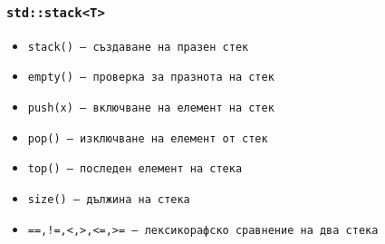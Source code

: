\documentclass{beamer}
\begin{document}
\begin{frame}
  \frametitle{\tt{std::stack<T>}}

  \begin{itemize}
  \item \tt{stack()} --- създаване на празен стек
  \item \tt{empty()} --- проверка за празнота на стек
  \item \tt{push(x)} --- включване на елемент на стек
  \item \tt{pop()} --- изключване на елемент от стек
  \item \tt{top()} --- последен елемент на стека
  \item \tt{size()} --- дължина на стека
  \item \tt{==,!=,<,>,<=,>=} --- лексикорафско сравнение на два стека
  \end{itemize}
\end{frame}
\end{document}
